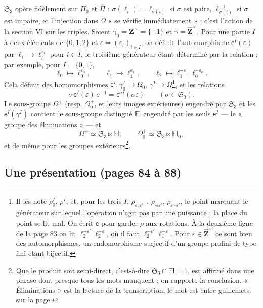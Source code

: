 \documentclass[11pt,a4paper]{article}
\begin{document}
$\mathfrak{S}_3$ opère fidèlement sur $\Pi_0$ et $\widehat\Pi$ :
$\sigma(\ell_i) = \ell_{\sigma(i)}$ si $\sigma$ est paire, $\ell_{\sigma(i)}^{-1}$
si $\sigma$ est impaire, et l'injection dans $\widetilde\Omega$ « se vérifie
immédiatement » ; c'est l'action de la section VI sur les triples. Soient
$\gamma_0 = \mathbf{Z}^\times = \{\pm 1\}$ et $\gamma = \widehat{\mathbf{Z}}^\times$.
Pour une partie $I$ à deux éléments de $\{0, 1, 2\}$ et $\varepsilon =
(\varepsilon_i)_{i \in I}$, on définit l'automorphisme $\mathsf{e}^I(\varepsilon)$
par $\ell_i \mapsto \ell_i^{\varepsilon_i}$ pour $i \in I$, le troisième générateur
étant déterminé par la relation ; par exemple, pour $I = \{0, 1\}$,
\[
  \ell_0 \mapsto \ell_0^{\varepsilon_0}, \qquad \ell_1 \mapsto
  \ell_1^{\varepsilon_1}, \qquad \ell_2 \mapsto \ell_1^{-\varepsilon_1}
  \ell_0^{-\varepsilon_0} .
\]
Cela définit des homomorphismes $\mathsf{e}^I : \gamma_0^I \to \Omega_0$,
$\gamma^I \to \Omega$\footnote{Il les note $\rho_0^I$, $\rho^I$, et, pour les trois
$I$, $\rho_{\varepsilon,\varepsilon'\cdot}$, $\rho_{\cdot\varepsilon\varepsilon'}$,
$\rho_{\varepsilon\cdot\varepsilon'}$, le point marquant le générateur sur
lequel l'opération n'agit pas par une puissance ; la place du point se lit
mal. On écrit $\mathsf{e}$ pour garder $\rho$ aux rotations. À la deuxième ligne de
la page 83 on lit $\ell_2^{-\varepsilon'}\ell_2^{-\varepsilon}$, où il faut
$\ell_2^{-\varepsilon'}\ell_1^{-\varepsilon}$. Pour $\varepsilon \in
\widehat{\mathbf{Z}}^\times$ ce sont bien des automorphismes, un endomorphisme
surjectif d'un groupe profini de type fini étant bijectif.}, et les relations
\[
  \sigma\, \mathsf{e}^I(\varepsilon)\, \sigma^{-1} = \mathsf{e}^{\sigma I}(\sigma
  \varepsilon) \qquad (\sigma \in \mathfrak{S}_3) .
\]
Le sous-groupe $\Omega^+$ (resp. $\Omega_0^+$, et leurs images extérieures)
engendré par $\mathfrak{S}_3$ et les $\mathsf{e}^I(\gamma^I)$ contient le
sous-groupe distingué $\mathbb{E}\mathrm{l}$ engendré par les seuls
$\mathsf{e}^I$ --- le « groupe des éliminations » --- et
\[
  \Omega^+ \simeq \mathfrak{S}_3 \ltimes \mathbb{E}\mathrm{l}, \qquad \Omega_0^+
  \simeq \mathfrak{S}_3 \ltimes \mathbb{E}\mathrm{l}_0 ,
\]
et de même pour les groupes extérieurs\footnote{Que le produit soit
semi-direct, c'est-à-dire $\mathfrak{S}_3 \cap \mathbb{E}\mathrm{l} = 1$, est
affirmé dans une phrase dont presque tous les mots manquent ; on rapporte la
conclusion. « Éliminations » est la lecture de la transcription, le mot est
entre guillemets sur la page.}.

\subsection*{Une présentation (pages 84 à 88)}
\end{document}
